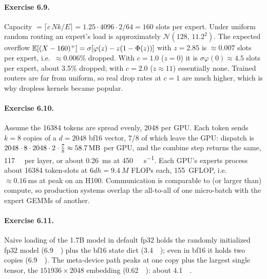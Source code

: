 \paragraph{Exercise 6.9.}
Capacity $=\lceil c\,Nk/E\rceil=1.25\cdot4096\cdot2/64=160$ slots per expert. Under uniform random
routing an expert's load is approximately $\mathcal N(128,\,11.2^2)$. The expected overflow
$\mathbb{E}[(X-160)^+]=\sigma[\varphi(z)-z(1-\Phi(z))]$ with $z=2.85$ is $\approx0.007$ slots per expert,
i.e.\ $\approx0.006\%$ dropped. With $c=1.0$ ($z=0$) it is $\sigma\varphi(0)\approx4.5$ slots per
expert, about 3.5\% dropped; with $c=2.0$ ($z\approx11$) essentially none. Trained routers are far from
uniform, so real drop rates at $c=1$ are much higher, which is why dropless kernels became popular.

\paragraph{Exercise 6.10.}
Assume the \num{16384} tokens are spread evenly, 2048 per GPU. Each token sends $k=8$ copies of a
$d=2048$ bf16 vector, 7/8 of which leave the GPU: dispatch is $2048\cdot8\cdot2048\cdot2\cdot\tfrac78
\approx\SI{58.7}{\mega\byte}$ per GPU, and the combine step returns the same, \SI{117}{\mega\byte} per
layer, or about \SI{0.26}{\milli\second} at \SI{450}{\giga\byte\per\second}. Each GPU's experts process
about \num{16384} token-slots at $6dh=\SI{9.4}{M}$ FLOPs each, \SI{155}{GFLOP}, i.e.\
$\approx\SI{0.16}{\milli\second}$ at peak on an H100. Communication is comparable to (or larger than)
compute, so production systems overlap the all-to-all of one micro-batch with the expert GEMMs of
another.

\paragraph{Exercise 6.11.}
Naive loading of the 1.7B model in default fp32 holds the randomly initialized fp32 model
(\SI{6.9}{\giga\byte}) plus the bf16 state dict (\SI{3.4}{\giga\byte}); even in bf16 it holds two
copies (\SI{6.9}{\giga\byte}). The meta-device path peaks at one copy plus the largest single tensor,
the $\num{151936}\times2048$ embedding (\SI{0.62}{\giga\byte}): about \SI{4.1}{\giga\byte}.
